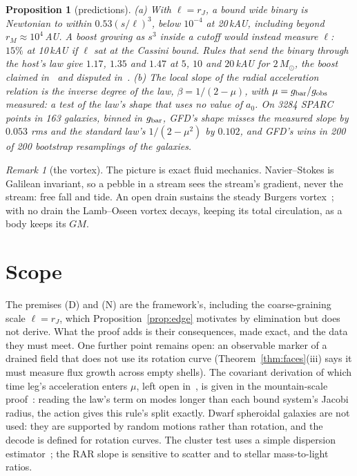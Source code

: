 \documentclass[twocolumn]{iopjournal}
\newtheorem{proposition}{Proposition}
\theoremstyle{definition}
\theoremstyle{remark}
\newtheorem*{remark}{Remark}
\begin{document}
\begin{proposition}[predictions]\label{prop:pred}
(a) With $\ell = r_J$, a bound wide binary is Newtonian to within
$0.53(s/\ell)^3$, below $10^{-4}$ at 20\,kAU, including beyond
$r_M \approx 10^4$\,AU. A boost growing as $s^3$ inside a cutoff would
instead measure $\ell$: $15\%$ at 10\,kAU if $\ell$ sat at the Cassini
bound. Rules that send the binary through the host's
law give $1.17$, $1.35$ and $1.47$ at $5$, $10$ and $20$\,kAU for
$2\,M_\odot$, the boost claimed in~\cite{Chae2023} and disputed
in~\cite{Banik2024}. (b) The local slope of the radial acceleration
relation is the inverse degree of the law, $\beta = 1/(2-\mu)$, with
$\mu = g_{\rm bar}/g_{\rm obs}$ measured: a test of the law's shape that
uses no value of $a_0$. On 3284 SPARC points in 163 galaxies, binned in
$g_{\rm bar}$, GFD's shape misses the measured slope by $0.053$ rms and
the standard law's $1/(2-\mu^2)$ by $0.102$, and GFD's wins in 200 of
200 bootstrap resamplings of the galaxies.
\end{proposition}

\begin{remark}[the vortex]
The picture is exact fluid mechanics. Navier--Stokes is Galilean
invariant, so a pebble in a stream sees the stream's gradient, never the
stream: free fall and tide. An open drain sustains the steady Burgers
vortex~\cite{Burgers1948}; with no drain the Lamb--Oseen vortex decays,
keeping its total circulation, as a body keeps its $GM$.
\end{remark}

\section*{Scope}

The premises (D) and (N) are the framework's, including the
coarse-graining scale $\ell = r_J$, which Proposition~\ref{prop:edge}
motivates by elimination but does not derive. What the proof adds is
their consequences, made exact, and the data they must meet. One
further point remains open: an observable marker of a drained field that does
not use its rotation curve (Theorem~\ref{thm:faces}(iii) says it must
measure flux growth across empty shells). The covariant derivation of
which time leg's acceleration enters $\mu$, left open
in~\cite{NelsonSST}, is given in the mountain-scale
proof~\cite{NelsonMS}: reading the law's term on modes longer than each
bound system's Jacobi radius, the action gives this rule's split
exactly. Dwarf spheroidal galaxies are not used: they are
supported by random motions rather than rotation, and the decode is
defined for rotation curves. The cluster test uses a simple dispersion
estimator~\cite{Wolf2010}; the RAR slope is sensitive to scatter and to
stellar mass-to-light ratios.
\end{document}
